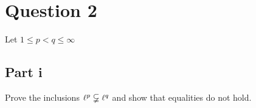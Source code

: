 \section{Question 2}

\begin{question}
    Let $1 \leq p < q \leq \infty$
\end{question}

\subsection{Part i}

\begin{question}
    Prove the inclusions $\ell^p \varsubsetneqq \ell^q$ and show that equalities do not hold.
\end{question}


